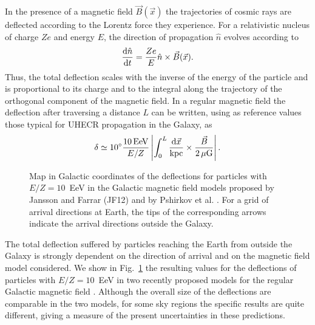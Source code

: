 \documentclass[twoside,12pt]{article}
\begin{document}
 In the presence of a magnetic field $\vec {B}(\vec{x})$ the trajectories of cosmic rays are deflected according to the Lorentz force they experience. For a relativistic nucleus of charge $Z e$ and energy $E$, the direction of propagation $\hat n$ evolves according to
\begin{equation}
\frac{{\rm d}{\hat n}}{{\rm d}t}=\frac{Z e}{E} {\hat n} \times {\vec B} ({\vec x}).
\label{lorentz}
\end{equation}
Thus, the total deflection scales with the inverse of the energy of the particle and is proportional to its charge and to the integral along the trajectory of the orthogonal component of the magnetic field. In a regular magnetic field the deflection after traversing a distance $L$ can be written, using as reference values those  typical for UHECR propagation in the Galaxy, as
\begin{equation}
\delta \simeq 10^\circ \frac{10\, {\rm EeV}}{E/Z} \left|\int_0^L\frac{{\rm d}{\vec x}}{ {\rm kpc}} \times \frac{\vec B}{2\, \mu {\rm G}}\right|.
\label{defreg}
\end{equation}

\begin{figure}
\begin{center}
\begin{minipage}[t]{8 cm}
\centerline{}
\end{minipage}
\begin{minipage}[t]{16.5 cm}
\caption{Map in Galactic coordinates of the deflections for particles with $E/Z = 10$~EeV in the Galactic magnetic field models proposed by Jansson and Farrar (JF12) \cite{jf12} and by Pshirkov et al. \cite{ps11}. For a grid of arrival directions at Earth, the tips of the corresponding arrows indicate the arrival directions outside the Galaxy.\label{jfvsp}}
\end{minipage}
\end{center}
\end{figure}

The total deflection suffered by particles reaching the Earth from outside the Galaxy is strongly dependent on the direction of arrival and on the magnetic field model considered. We show in Fig.~\ref{jfvsp} the resulting values for the deflections of particles with $E/Z = 10$~EeV in two recently proposed models for the regular Galactic magnetic field \cite{jf12,ps11}. Although the overall size of the deflections are comparable in the two models, for some sky regions the specific results are quite different, giving a measure of the present uncertainties in these predictions.
\end{document}
